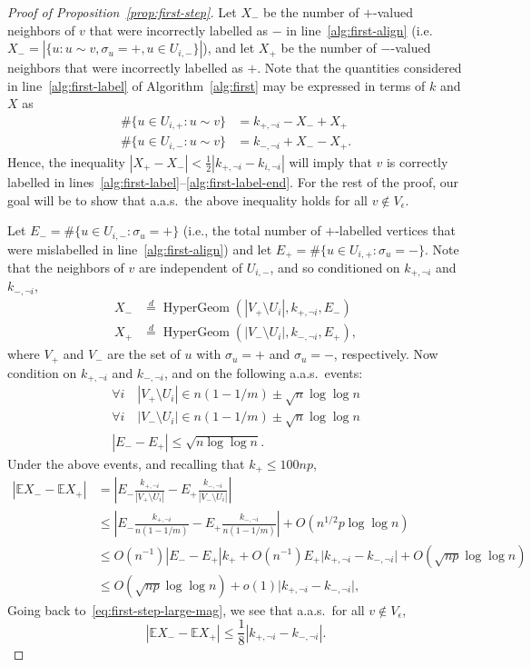 \documentclass[EJP]{ejpecp}
\newcommand{\E}{\mathbb{E}}
\newcommand{\1}[1]{\mathbbm{1}_{\{#1\}}}
\DeclareMathOperator{\HyperGeom}{HyperGeom}
\newcommand{\eqD}{\stackrel{d}{=}}
\newcommand{\noti}{\lnot i}
\begin{document}
\begin{proof}[Proof of Proposition~\ref{prop:first-step}]
 Let $X_-$ be the number of $+$-valued neighbors of $v$ that were incorrectly
 labelled as $-$ in line~\ref{alg:first-align}
 (i.e. $X_- = |\{u : u \sim v, \sigma_u = +, u \in U_{i,-}\}|$), and let $X_+$ be the number
 of $-$-valued neighbors that were incorrectly labelled as $+$.
 Note that the quantities considered in line~\ref{alg:first-label}
 of Algorithm~\ref{alg:first} may be expressed in terms of
 $k$ and $X$ as
 \begin{align*}
   \#\{u \in U_{i,+}: u \sim v\} &= k_{+,\noti} - X_- + X_+ \\
   \#\{u \in U_{i,-}: u \sim v\} &= k_{-,\noti} + X_- - X_+.
 \end{align*}
 Hence, the inequality $|X_+ - X_-| < \frac 12 |k_{+,\noti} - k_{i,\noti}|$
 will imply that $v$ is correctly labelled in
 lines~\ref{alg:first-label}--\ref{alg:first-label-end}.
 For the rest of the proof, our goal will be to show that a.a.s.\ the
 above inequality holds for all $v \not \in V_\epsilon$.

 Let $E_- = \# \{u \in U_{i,-} : \sigma_u = +\}$
 (i.e., the total number of $+$-labelled vertices
 that were mislabelled in line~\ref{alg:first-align}) and let
 $E_+ = \# \{u \in U_{i,+} : \sigma_u = -\}$.
 Note that the neighbors of $v$ are independent of $U_{i,-}$, and so
 conditioned on $k_{+,\noti}$ and $k_{-,\noti}$,
 \begin{align*}
  X_- &\eqD \HyperGeom(|V_+ \setminus U_i|, k_{+,\noti}, E_-) \\
  X_+ &\eqD \HyperGeom(|V_- \setminus U_i|, k_{-,\noti}, E_+),
 \end{align*}
 where $V_+$ and $V_-$ are the set of $u$ with $\sigma_u = +$
 and $\sigma_u = -$, respectively.
 Now condition on $k_{+,\noti}$ and $k_{-,\noti}$,
 and on the following a.a.s.\ events:
 \begin{gather*}
   \forall i \quad |V_+ \setminus U_i| \in n(1-1/m) \pm \sqrt{n} \log \log n \\
   \forall i \quad |V_- \setminus U_i| \in n(1-1/m) \pm \sqrt{n} \log \log n \\
   |E_- - E_+| \le \sqrt {n \log \log n}.
 \end{gather*}
 Under the above events, and recalling that $k_+ \le 100np$,
 \begin{align*}
  |\E X_- - \E X_+|
  &= \left|
  E_- \frac{k_{+,\noti}}{|V_+ \setminus U_i|}
  - E_+ \frac{k_{-,\noti}}{|V_- \setminus U_i|}
  \right| \\
  &\le \left|
  E_- \frac{k_{+,\noti}}{n(1-1/m)}
  - E_+ \frac{k_{-,\noti}}{n(1-1/m)}
  \right|
  + O(n^{1/2} p \log \log n) \\
  &\le O(n^{-1}) |E_- - E_+| k_+
     + O(n^{-1}) E_+ \big|k_{+,\noti} - k_{-,\noti}\big|
     + O(\sqrt{np} \log \log n) \\
  &\le O(\sqrt{np} \log \log n)
     + o(1) \big|k_{+,\noti} - k_{-,\noti}\big|,
 \end{align*}
 Going back to~\eqref{eq:first-step-large-mag},
 we see that a.a.s.\ for all $v \not \in V_\epsilon$,
 \[
   |\E X_- - \E X_+| \le \frac{1}{8} |k_{+,\noti} - k_{-,\noti}|.
 \]


\end{proof}
\end{document}
